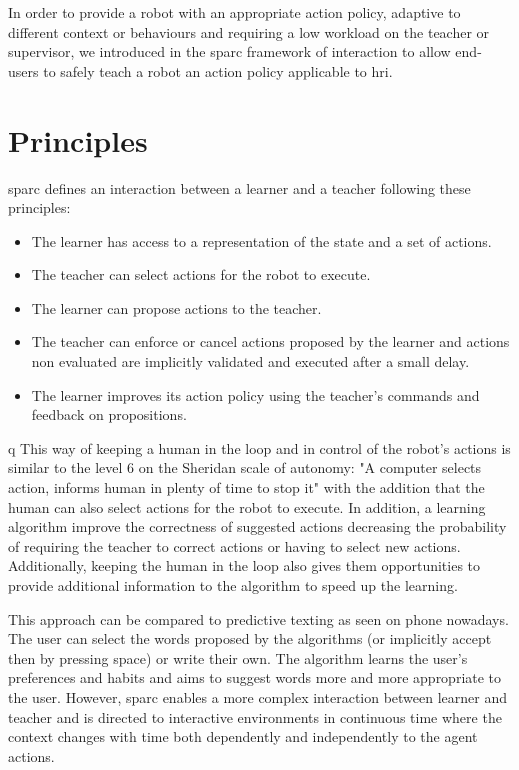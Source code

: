 In order to provide a robot with an appropriate action policy, adaptive to different context or behaviours and requiring a low workload on the teacher or supervisor, we introduced in \cite{senft2015sparc} the \acrfull{sparc} framework of interaction to allow end-users to safely teach a robot an action policy applicable to \gls{hri}.

\section{Principles} \label{sec:sparc_principles}

\gls{sparc} defines an interaction between a learner and a teacher following these principles:
\begin{itemize}
	\item The learner has access to a representation of the state and a set of actions.
	\item The teacher can select actions for the robot to execute.
	\item The learner can propose actions to the teacher.
	\item The teacher can enforce or cancel actions proposed by the learner and actions non evaluated are implicitly validated and executed after a small delay.
	\item The learner improves its action policy using the teacher's commands and feedback on propositions.
\end{itemize} 
q
This way of keeping a human in the loop and in control of the robot's actions is similar to the level 6 on the Sheridan scale of autonomy: "A computer selects action, informs human in plenty of time to stop it" \citep{sheridan1978human} with the addition that the human can also select actions for the robot to execute. In addition, a learning algorithm improve the correctness of suggested actions decreasing the probability of requiring the teacher to correct actions or having to select new actions. Additionally, keeping the human in the loop also gives them opportunities to provide additional information to the algorithm to speed up the learning.

This approach can be compared to predictive texting as seen on phone nowadays. The user can select the words proposed by the algorithms (or implicitly accept then by pressing space) or write their own. The algorithm learns the user's preferences and habits and aims to suggest words more and more appropriate to the user. However, \gls{sparc} enables a more complex interaction between learner and teacher and is directed to interactive environments in continuous time where the context changes with time both dependently and independently to the agent actions.

